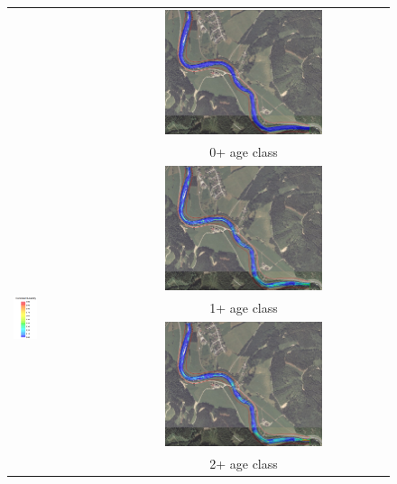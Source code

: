 \centering
\begin{figure}[h!]                                                   	%
	\begin{tabular}{ l  c }
		
		& \includegraphics[width=0.56\textwidth,valign=t]{images/0_2000}\\
		& 0+ age class\\
		\multirow{4}{*}{\includegraphics[width=0.3\textwidth,valign=t]{images/suitability_index}}& \includegraphics[width=0.56\textwidth,valign=t]{images/1_2000}\\
		& 1+ age class\\
		& \includegraphics[width=0.56\textwidth,valign=t]{images/2_2000}\\
		& 2+ age class
		

\end{tabular}
\end{figure}

